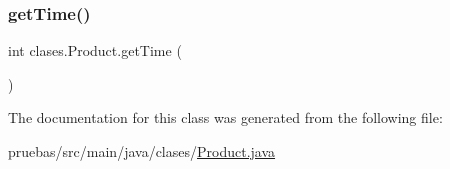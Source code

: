 \mbox{\label{classclases_1_1_product_a3662b5c449fbdd04155eedf9785cb3e8}} 
\subsubsection{\texorpdfstring{get\+Time()}{getTime()}}
{\footnotesize\ttfamily int clases.\+Product.\+get\+Time (\begin{DoxyParamCaption}{ }\end{DoxyParamCaption})}



The documentation for this class was generated from the following file\+:\begin{DoxyCompactItemize}
\item 
pruebas/src/main/java/clases/\mbox{\hyperlink{_product_8java}{Product.\+java}}\end{DoxyCompactItemize}
